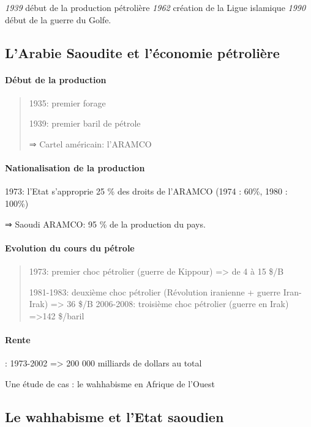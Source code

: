 \emph{1939} début de la production pétrolière \emph{1962} création de la
Ligue islamique \emph{1990} début de la guerre du Golfe.
 

 
\subsection{L'Arabie Saoudite et l'économie
pétrolière} 
 
\paragraph{ {Début de la
production}} 

\begin{quote}
1935: premier forage

1939: premier baril de pétrole

⇒ Cartel américain: l'ARAMCO
\end{quote}

 
\paragraph{{Nationalisation de la
production}}


1973: l'Etat s'approprie 25 \% des droits de l'ARAMCO (1974 : 60\%, 1980 : 100\%)


⇒ Saoudi ARAMCO: 95 \% de la production du pays.

 
\paragraph{Evolution du cours du
pétrole} 

\begin{quote}
1973: premier choc pétrolier (guerre de Kippour) =\textgreater{} de 4 à
15 \$/B

1981-1983: deuxième choc pétrolier (Révolution iranienne + guerre
Iran-Irak) =\textgreater{} 36 \$/B 2006-2008: troisième choc pétrolier
(guerre en Irak) =\textgreater142 \$/baril
\end{quote}

\paragraph{{Rente}}: 1973-2002 =\textgreater{} 200 000 milliards
de dollars au total
 
    Une étude de cas : le wahhabisme en Afrique de l'Ouest
    
\subsection{Le wahhabisme et l'Etat saoudien}

